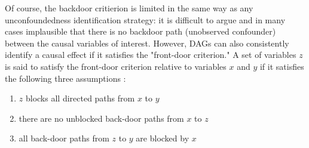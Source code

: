 \documentclass{article}
\begin{document}
Of course, the backdoor critierion is limited in the same way as any unconfoundedness identification strategy: it is difficult to argue and in many cases implausible that there is no backdoor path (unobserved confounder) between the causal variables of interest. However, DAGs can also consistently identify a causal effect if it satisfies the "front-door criterion." A set of variables $z$ is said to satisfy the front-door criterion relative to variables $x$ and $y$ if it satisfies the following three assumptions \parencite{pearl2009causality}:

\begin{enumerate}
  \item $z$ blocks all directed paths from $x$ to $y$
  \item there are no unblocked back-door paths from $x$ to $z$
  \item all back-door paths from $z$ to $y$ are blocked by $x$
\end{enumerate}
\end{document}
